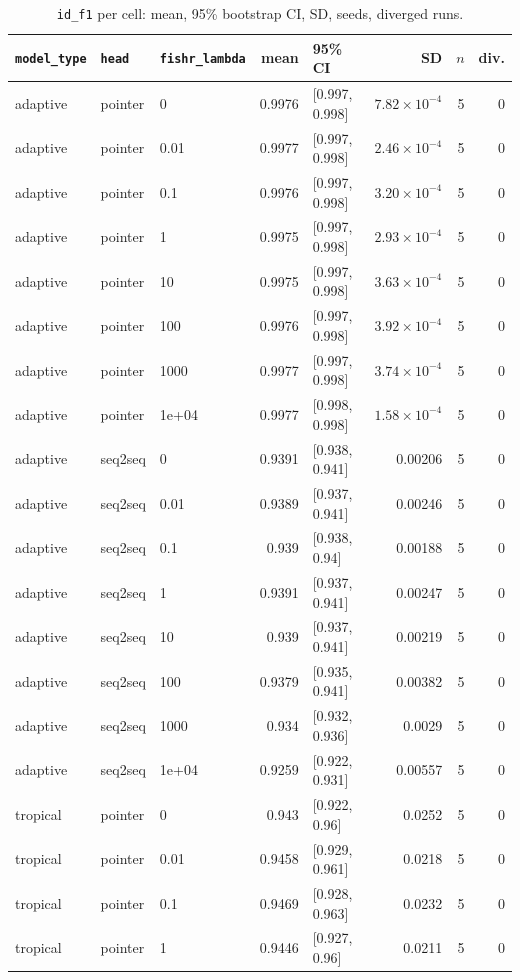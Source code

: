\documentclass[10pt]{article}
\begin{document}
{\small
\begin{longtable}{lllrlrrr}
\caption{\texttt{id\_f1} per cell: mean, 95\% bootstrap CI, SD, seeds, diverged runs.}\label{tab:summary-id_f1}\\
\toprule
\texttt{model\_type} & \texttt{head} & \texttt{fishr\_lambda} & mean & 95\% CI & SD & $n$ & div.\\
\midrule
\endhead
adaptive & pointer & 0 & 0.9976 & [0.997, 0.998] & $7.82\times10^{-4}$ & 5 & 0\\
adaptive & pointer & 0.01 & 0.9977 & [0.997, 0.998] & $2.46\times10^{-4}$ & 5 & 0\\
adaptive & pointer & 0.1 & 0.9976 & [0.997, 0.998] & $3.20\times10^{-4}$ & 5 & 0\\
adaptive & pointer & 1 & 0.9975 & [0.997, 0.998] & $2.93\times10^{-4}$ & 5 & 0\\
adaptive & pointer & 10 & 0.9975 & [0.997, 0.998] & $3.63\times10^{-4}$ & 5 & 0\\
adaptive & pointer & 100 & 0.9976 & [0.997, 0.998] & $3.92\times10^{-4}$ & 5 & 0\\
adaptive & pointer & 1000 & 0.9977 & [0.997, 0.998] & $3.74\times10^{-4}$ & 5 & 0\\
adaptive & pointer & 1e+04 & 0.9977 & [0.998, 0.998] & $1.58\times10^{-4}$ & 5 & 0\\
adaptive & seq2seq & 0 & 0.9391 & [0.938, 0.941] & 0.00206 & 5 & 0\\
adaptive & seq2seq & 0.01 & 0.9389 & [0.937, 0.941] & 0.00246 & 5 & 0\\
adaptive & seq2seq & 0.1 & 0.939 & [0.938, 0.94] & 0.00188 & 5 & 0\\
adaptive & seq2seq & 1 & 0.9391 & [0.937, 0.941] & 0.00247 & 5 & 0\\
adaptive & seq2seq & 10 & 0.939 & [0.937, 0.941] & 0.00219 & 5 & 0\\
adaptive & seq2seq & 100 & 0.9379 & [0.935, 0.941] & 0.00382 & 5 & 0\\
adaptive & seq2seq & 1000 & 0.934 & [0.932, 0.936] & 0.0029 & 5 & 0\\
adaptive & seq2seq & 1e+04 & 0.9259 & [0.922, 0.931] & 0.00557 & 5 & 0\\
tropical & pointer & 0 & 0.943 & [0.922, 0.96] & 0.0252 & 5 & 0\\
tropical & pointer & 0.01 & 0.9458 & [0.929, 0.961] & 0.0218 & 5 & 0\\
tropical & pointer & 0.1 & 0.9469 & [0.928, 0.963] & 0.0232 & 5 & 0\\
tropical & pointer & 1 & 0.9446 & [0.927, 0.96] & 0.0211 & 5 & 0\\

\end{longtable}}
\end{document}
